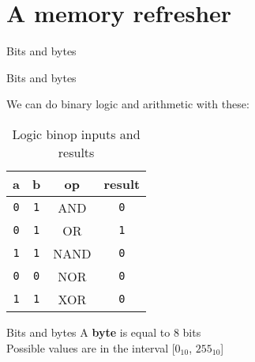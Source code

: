 \documentclass[../index.tex]{subfiles}
\begin{document}
\renewcommand{\sectiontitle}{A memory refresher}
\section{\sectiontitle}

\renewcommand{\currenttitle}{Bits and bytes}
\begin{frame}{\currenttitle}
%
   \\
\end{frame}

\begin{frame}{\currenttitle}
  \newcommand{\false}{\texttt{0}}
  \newcommand{\true}{\texttt{1}}

  We can do binary logic and arithmetic with these:

  \begin{table}
    \begin{tabular}{c c c c}
      a & b & op & result \\
      \hline{}
      \false{} & \true{} & AND & \false{} \\
      \false{} & \true{} & OR & \true{} \\
      \true{} & \true{} & NAND & \false{} \\
      \false{} & \false{} & NOR & \false{} \\
      \true{} & \true{} & XOR & \false{}
    \end{tabular}
    \caption{Logic binop inputs and results}
  \end{table}
\end{frame}

\begin{frame}{\currenttitle}
%
  A \textbf{byte} is equal to 8 bits \\

  Possible values are in the interval [$0_{10}$, $255_{10}$]
\end{frame}
\end{document}
